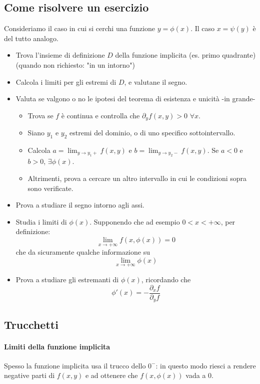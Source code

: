 \documentclass[a4paper,12pt]{book}
\begin{document}
\subsection{Come risolvere un esercizio}
Consideriamo il caso in cui si cerchi una funzione $y=\phi(x)$. Il caso $x=\psi(y)$ è del tutto analogo.
\begin{itemize}
 \item Trova l'insieme di definizione $D$ della funzione implicita (es. primo quadrante) (quando non richiesto: "in un intorno")
 \item Calcola i limiti per gli estremi di $D$, e valutane il segno.
 \item Valuta se valgono o no le ipotesi del teorema di esistenza e unicità -in grande-
 \begin{itemize}
  \item Trova se $f$ è continua e controlla che $\partial_y f(x, y) > 0$ $\forall x$.
  \item Siano $y_1$ e $y_2$ estremi del dominio, o di uno specifico sottointervallo.
  \item Calcola $a = \displaystyle\lim_{y \to y_1+}{f(x, y)}$ e $b = \displaystyle\lim_{y \to y_2-}{f(x, y)}$. Se $a < 0$ e $b > 0$, $\exists \phi(x)$.
  \item Altrimenti, prova a cercare un altro intervallo in cui le condizioni sopra sono verificate.
 \end{itemize}
 \item Prova a studiare il segno intorno agli assi.
 \item Studia i limiti di $\phi(x)$. Supponendo che ad esempio $0 < x < +\infty$, per definizione:
	 $$ \lim_{x \to +\infty} f(x, \phi(x)) = 0$$
	 che da sicuramente qualche informazione su
	 $$ \lim_{x \to +\infty} \phi(x) $$
 \item Prova a studiare gli estremanti di $\phi(x)$, ricordando che
 	 $$\phi'(x) = -\displaystyle\frac{\partial_x f}{\partial_y f}$$
\end{itemize}

\subsection{Trucchetti}
\paragraph{Limiti della funzione implicita}
Spesso la funzione implicita usa il trucco dello $0^-$: in questo modo riesci a rendere negative parti di $f(x,y)$ e ad ottenere che $f(x,\phi(x))$ vada a 0.
\end{document}
